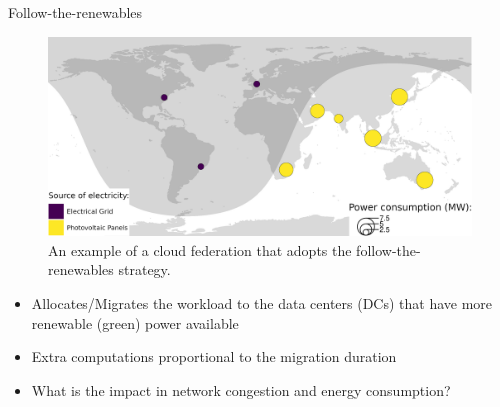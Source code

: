 \documentclass[Ligatures=TeX,table,svgnames,usetotalslideindicator,compress,10pt,aspectratio=169]{beamer}
\begin{document}
\begin{frame}{Follow-the-renewables}

\begin{figure}[h]
\centering
  \includegraphics[width=.7\linewidth]{images/example_follow_the_renewables.png}
  \caption{An example of a cloud federation that adopts the follow-the-renewables strategy.}
  \label{fig:ex_follow_the_renewables}
\end{figure}
\vspace{-10pt}

\begin{itemize}    
  \item Allocates/Migrates the workload to the data centers (DCs) that have more renewable (green) power available
 \item Extra computations proportional to the migration duration 
 \item What is the impact in \alert{network congestion} and \alert{energy consumption}? 
  \end{itemize}
\end{frame}




    
  
\end{document}
